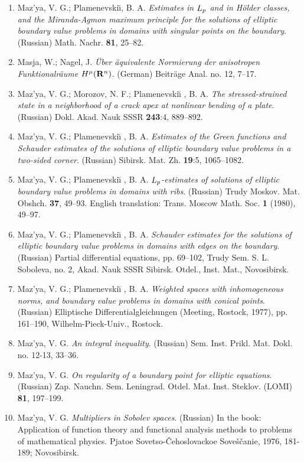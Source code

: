\documentclass{article}
\begin{document}
\begin{enumerate}
{\bf 1978}
\item Maz'ya, V. G.; Plamenevski{\u\i}, B. A. {\it Estimates in
$L\sb{p}$
and in H\"older classes, and the
Miranda-Agmon maximum principle for the solutions of elliptic boundary
value problems in domains with singular points on the
boundary}. (Russian) Math. Nachr. {\bf 81}, 25--82.
\item Masja, W.; Nagel, J. {\it \"Uber {\"a}quivalente Normierung der
anisotropen
Funktionalr{\"a}ume $H\sp{\mu }({\bf R}\sp{n})$}. (German)
Beitr{\"a}ge
Anal. no. 12, 7--17.
\item Maz'ya, V. G.; Morozov, N. F.; Plamenevski{\u\i} , B. A. {\it
The
stressed-strained state in a neighborhood
of a crack apex at nonlinear bending of a plate}. (Russian) Dokl.
Akad.
Nauk SSSR {\bf 243}:4, 889--892.
\item Maz'ya, V. G.; Plamenevski{\u\i} , B. A. {\it Estimates of the
Green
functions and Schauder estimates of
the solutions of elliptic boundary value problems in a two-sided
corner}.
(Russian) Sibirsk. Mat. Zh. {\bf 19}:5,
1065--1082.
\item Maz'ya, V. G.; Plamenevski{\u\i} , B. A. {\it
$L\sb{p}$-estimates of
solutions of elliptic boundary
value problems in domains with ribs}. (Russian) Trudy Moskov. Mat.
Obshch.
{\bf 37}, 49--93. English translation: Trans. Moscow Math. Soc. {\bf 1} (1980), 49--97.
\item Maz'ya, V. G.; Plamenevski{\u\i} , B. A. {\it Schauder estimates
for
the solutions of elliptic boundary
value problems in domains with edges on the boundary}. (Russian)
Partial
differential equations, pp. 69--102, Trudy
Sem. S. L. Soboleva, no. 2, Akad. Nauk SSSR Sibirsk. Otdel., Inst.
Mat.,
Novosibirsk.
\item Maz'ya, V. G.; Plamenevski{\u\i} , B. A. {\it Weighted spaces
with
inhomogeneous norms, and boundary
value problems in domains with conical points}. (Russian) Elliptische
Differentialgleichungen (Meeting, Rostock, 1977), pp.
161--190, Wilhelm-Pieck-Univ., Rostock.
\item Maz'ya, V. G. {\it An integral inequality}. (Russian) Sem. Inst.
Prikl. Mat. Dokl. no. 12-13, 33--36.
\item Maz'ya, V. G. {\it On regularity of a boundary point for
elliptic
equations}.  (Russian) Zap. Nauchn. Sem. Leningrad.
Otdel. Mat. Inst. Steklov. (LOMI) {\bf 81}, 197--199.
\item Maz'ya, V. G. {\it Multipliers in Sobolev spaces}. (Russian) In
the
book: Application of function theory and functional
analysis methods to problems of mathematical physics. Pjatoe
Sovetso-\v
Cehoslovackoe Sove\v s\v canie, 1976, 181-189;
Novosibirsk.\hfill\break


\end{enumerate}
\end{document}
